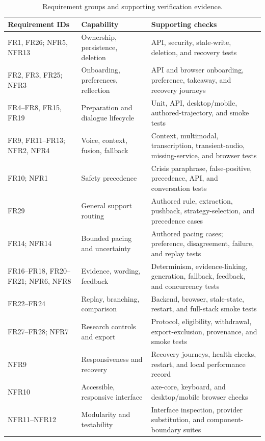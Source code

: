 \begin{table}[htbp]
\centering
\caption{Requirement groups and supporting verification evidence.}
\label{tab:requirements-traceability}
\small
\setlength{\tabcolsep}{4pt}
\renewcommand{\arraystretch}{1.1}
\begin{tabularx}{\textwidth}{|>{\raggedright\arraybackslash}p{}|>{\raggedright\arraybackslash}p{}|>{\raggedright\arraybackslash}X|}
\hline
\textbf{Requirement IDs} & \textbf{Capability} & \textbf{Supporting checks} \\ \hline
FR1, FR26; NFR5, NFR13 & Ownership, persistence, deletion & API, security, stale-write, deletion, and recovery tests \\ \hline
FR2, FR3, FR25; NFR3 & Onboarding, preferences, reflection & API and browser onboarding, preference, takeaway, and recovery journeys \\ \hline
FR4--FR8, FR15, FR19 & Preparation and dialogue lifecycle & Unit, API, desktop/mobile, authored-trajectory, and smoke tests \\ \hline
FR9, FR11--FR13; NFR2, NFR4 & Voice, context, fusion, fallback & Context, multimodal, transcription, transient-audio, missing-service, and browser tests \\ \hline
FR10; NFR1 & Safety precedence & Crisis paraphrase, false-positive, precedence, API, and conversation tests \\ \hline
FR29 & General support routing & Authored rule, extraction, pushback, strategy-selection, and precedence cases \\ \hline
FR14; NFR14 & Bounded pacing and uncertainty & Authored pacing cases; preference, disagreement, failure, and replay tests \\ \hline
FR16--FR18, FR20--FR21; NFR6, NFR8 & Evidence, wording, feedback & Determinism, evidence-linking, generation, fallback, feedback, and concurrency tests \\ \hline
FR22--FR24 & Replay, branching, comparison & Backend, browser, stale-state, restart, and full-stack smoke tests \\ \hline
FR27--FR28; NFR7 & Research controls and export & Protocol, eligibility, withdrawal, export-exclusion, provenance, and smoke tests \\ \hline
NFR9 & Responsiveness and recovery & Recovery journeys, health checks, restart, and local performance record \\ \hline
NFR10 & Accessible, responsive interface & axe-core, keyboard, and desktop/mobile browser checks \\ \hline
NFR11--NFR12 & Modularity and testability & Interface inspection, provider substitution, and component-boundary suites \\ \hline
\end{tabularx}
\end{table}

